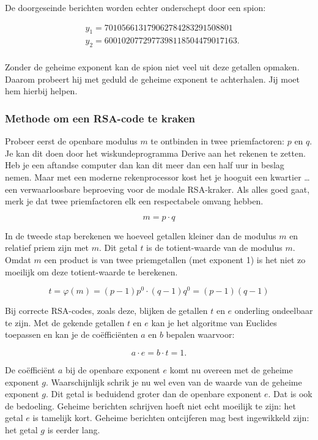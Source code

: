 \noindent De doorgeseinde berichten worden echter onderschept door een spion:

\[
\begin{aligned}
&y_1=701 056 613 179 062 784 283 291 508 801\\
&y_2=6 001 020 772 977 398 118 504 479 017 163.\\
\end{aligned}
\]

\noindent Zonder de geheime exponent kan de spion niet veel uit deze getallen opmaken. Daarom probeert hij met geduld de geheime exponent te achterhalen. Jij moet hem hierbij helpen.

\subsubsection*{Methode om een RSA-code te kraken}
Probeer eerst de openbare modulus $m$ te ontbinden in twee priemfactoren: $p$ en $q$. Je kan dit doen door het wiskundeprogramma Derive aan het rekenen te zetten. Heb je een aftandse computer dan kan dit meer dan een half uur in beslag nemen. Maar met een moderne rekenprocessor kost het je hooguit een kwartier … een verwaarloosbare beproeving voor de modale RSA-kraker. Als alles goed gaat, merk je dat twee priemfactoren elk een respectabele omvang hebben.

\[m=p \cdot q\]

In de tweede stap berekenen we hoeveel getallen kleiner dan de modulus $m$ en relatief priem zijn met $m$. Dit getal $t$ is de totient-waarde van de modulus $m$. Omdat $m$ een product is van twee priemgetallen (met exponent 1) is het niet zo moeilijk om deze totient-waarde te berekenen.

\[t=\varphi(m)=(p-1)p^0 \cdot (q-1)q^0=(p-1)(q-1)\]

Bij correcte RSA-codes, zoals deze, blijken de getallen $t$ en $e$ onderling ondeelbaar te zijn. Met de gekende getallen $t$ en $e$ kan je het algoritme van Euclides toepassen en kan je de coëfficiënten $a$ en $b$ bepalen waarvoor:

\[a \cdot e = b \cdot t = 1.\]

De coëfficiënt $a$ bij de openbare exponent $e$ komt nu overeen met de geheime exponent $g$. Waarschijnlijk schrik je nu wel even van de waarde van de geheime exponent $g$. Dit getal is beduidend groter dan de openbare exponent $e$. Dat is ook de bedoeling. Geheime berichten schrijven hoeft niet echt moeilijk te zijn: het getal $e$ is tamelijk kort. Geheime berichten ontcijferen mag best ingewikkeld zijn: het getal $g$ is eerder lang.


